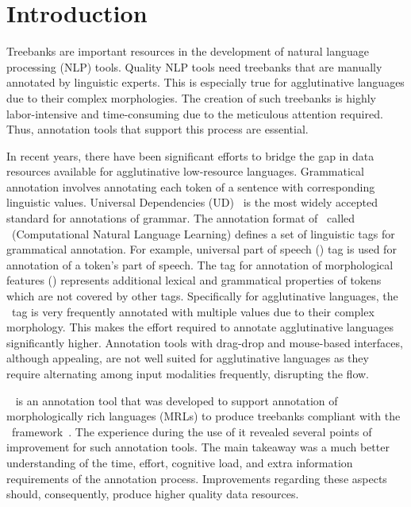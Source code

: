 \section{Introduction}
\label{sec:introduction}

Treebanks are important resources in the development of natural language processing (NLP) tools.
Quality NLP tools need treebanks that are manually annotated by linguistic experts.
This is especially true for agglutinative languages due to their complex morphologies.
The creation of such treebanks is highly labor-intensive and time-consuming due to the meticulous attention required.
Thus, annotation tools that support this process are essential.

In recent years, there have been significant efforts to bridge the gap in data resources available for agglutinative low-resource languages.
Grammatical annotation involves annotating each token of a sentence with corresponding linguistic values.
Universal Dependencies (UD)~\cite{UD} is the most widely accepted standard for annotations of grammar.
The annotation format of \ud\ called \conllu\ (Computational Natural Language Learning) defines a set of linguistic tags for grammatical annotation.
For example, universal part of speech (\upos) tag is used for annotation of a token's part of speech.
The tag for annotation of morphological features (\feats) represents additional lexical and grammatical properties of tokens which are not covered by other tags.
Specifically for agglutinative languages, the \feats\ tag is very frequently annotated with multiple values due to their complex morphology.
This makes the effort required to annotate agglutinative languages significantly higher.
Annotation tools with drag-drop and mouse-based interfaces, although appealing, are not well suited for agglutinative languages as they require alternating among input modalities frequently, disrupting the flow.

\boatvone~\cite{turk2021resources} is an annotation tool that was developed to support annotation of morphologically rich languages (MRLs) to produce treebanks compliant with the \ud\ framework~\cite{UD}.
The experience during the use of it revealed several points of improvement for such annotation tools.
The main takeaway was a much better understanding of the time, effort, cognitive load, and extra information requirements of the annotation process.
Improvements regarding these aspects should, consequently, produce higher quality data resources.

